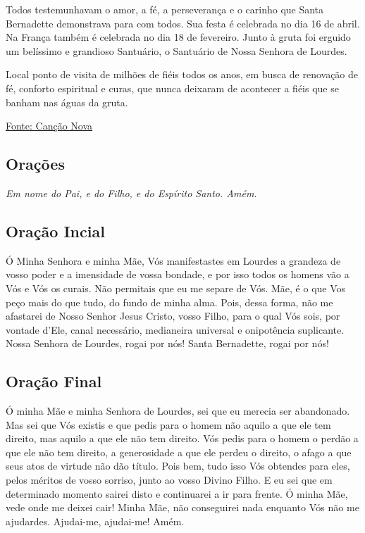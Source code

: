 \documentclass[18pt]{article}
\begin{document}
\begin{justify}
Todos testemunhavam o amor, a fé, a perseverança e o carinho que Santa Bernadette demonstrava para com todos. Sua festa é celebrada no dia 16 de abril. Na França também é celebrada no dia 18 de fevereiro. Junto à gruta foi erguido um belíssimo e grandioso Santuário, o Santuário de Nossa Senhora de Lourdes.

Local ponto de visita de milhões de fiéis todos os anos, em busca de renovação de fé, conforto espiritual e curas, que nunca deixaram de acontecer a fiéis que se banham nas águas da gruta.


\vfill

\begin{center}
 \href{https://santo.cancaonova.com/santo/santas-perpetua-e-felicidade/}{Fonte: Canção Nova}
\end{center}


\newpage
\begin{center}
 \section{Orações}\label{sec:Orações} %
\textit{Em nome do Pai, e do Filho, e do Espírito Santo. Amém.}
\end{center}

\subsection{Oração Incial}\label{sec:Oração_Inicial} %

Ó Minha Senhora e minha Mãe, Vós manifestastes em Lourdes a grandeza de vosso poder e a imensidade de vossa bondade, e por isso todos os homens vão a Vós e Vós os curais. Não permitais que eu me separe de Vós. Mãe, é o que Vos peço mais do que tudo, do fundo de minha alma. Pois, dessa forma, não me afastarei de Nosso Senhor Jesus Cristo, vosso Filho, para o qual Vós sois, por vontade d’Ele, canal necessário, medianeira universal e onipotência suplicante. Nossa Senhora de Lourdes, rogai por nós! Santa Bernadette, rogai por nós!

\subsection{Oração Final}\label{sec:Oração_Final} %

Ó minha Mãe e minha Senhora de Lourdes, sei que eu merecia ser abandonado. Mas sei que Vós existis e que pedis para o homem não aquilo a que ele tem direito, mas aquilo a que ele não tem direito. Vós pedis para o homem o perdão a que ele não tem direito, a generosidade a que ele perdeu o direito, o afago a que seus atos de virtude não dão título. Pois bem, tudo isso Vós obtendes para eles, pelos méritos de vosso sorriso, junto ao vosso Divino Filho. E eu sei que em determinado momento sairei disto e continuarei a ir para frente. Ó minha Mãe, vede onde me deixei cair! Minha Mãe, não conseguirei nada enquanto Vós não me ajudardes. Ajudai-me, ajudai-me! Amém.


\end{justify}
\end{document}
